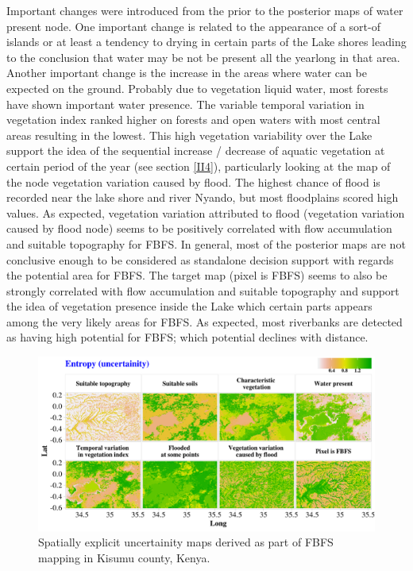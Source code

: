 \documentclass[12pt,oneside]{article}
\begin{document}
Important changes were introduced from the prior to the posterior maps of water present node. One important change is related to the appearance of a sort-of islands or at least a tendency to drying in certain parts of the Lake shores leading to the conclusion that water may be not be present all the yearlong in that area. Another important change is the increase in the areas where water can be expected on the ground. Probably due to vegetation liquid water, most forests have shown important water presence. The variable temporal variation in vegetation index ranked higher on forests and open waters with most central areas resulting in the lowest. This high vegetation variability over the Lake support the idea of the sequential increase / decrease of aquatic vegetation at certain period of the year (see section \ref{II4}), particularly looking at the map of the node vegetation variation caused by flood. The highest chance of flood is recorded near the lake shore and river Nyando, but most floodplains scored high values. As expected, vegetation variation attributed to flood (vegetation variation caused by flood node) seems to be positively correlated with flow accumulation and suitable topography for FBFS. In general, most of the posterior maps are not conclusive enough to be considered as standalone decision support with regards the potential area for FBFS. The target map (pixel is FBFS) seems to also be strongly correlated with flow accumulation and suitable topography and support the idea of vegetation presence inside the Lake which certain parts appears among the very likely areas for FBFS. As expected, most riverbanks are detected as having high potential for FBFS; which potential declines with distance.

\begin{figure}[!htbp]

{\centering \includegraphics[width=1\linewidth,]{figures/Mapping_FBFS_uncertainity_maps} 

}

\caption{Spatially explicit uncertainity maps derived as part of FBFS mapping in Kisumu county, Kenya.}\label{fig:fig13}
\end{figure}
\end{document}
